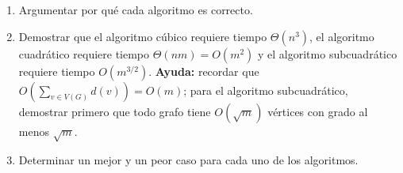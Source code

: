  \begin{enumerate}[label=$\alph*)$,ref=$\alph*)$]
  \item Argumentar por qué cada algoritmo es correcto.
  \item Demostrar que el algoritmo cúbico requiere tiempo $\Theta(n^3)$, el algoritmo cuadrático requiere tiempo $\Theta(nm) = O(m^2)$ y el algoritmo subcuadrático requiere tiempo $O(m^{3/2})$.  \textbf{Ayuda:} recordar que $O(\sum_{v \in V(G)} d(v)) = O(m)$; para el algoritmo subcuadrático, demostrar primero que todo grafo tiene $O(\sqrt{m})$ vértices con grado al menos $\sqrt{m}$.
  \item Determinar un mejor y un peor caso para cada uno de los algoritmos.
 \end{enumerate}

